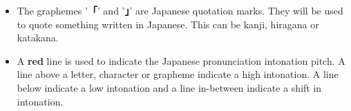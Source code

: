 \begin{itemize}
    \item[\Large\jquotesingleja{\ldots}]

            The graphemes '\textbf{「}' and '\textbf{」}' are Japanese
            quotation marks. They will be used to quote something written in
            Japanese.  This can be kanji, hiragana or katakana.


    \item[\Large{\jpitch[br]{{X}}\jpitch[lt]{{Y}}}]

            A \textbf{red} line is used to indicate the Japanese pronunciation
            intonation pitch. A line above a letter, character or grapheme
            indicate a high intonation. A line below indicate a low intonation
            and a line in-between indicate a shift in intonation.



\end{itemize}
